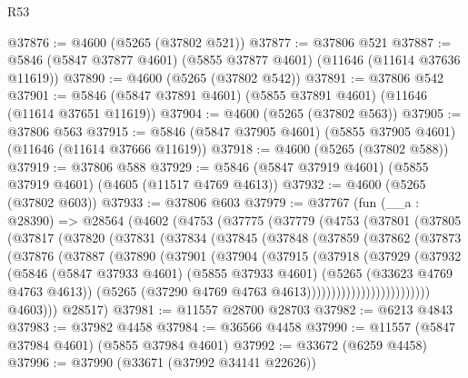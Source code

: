 \begin{lexlean}{R53}
\begin{coremodule}
@37876 := @4600 (@5265 (@37802 @521))
@37877 := @37806 @521
@37887 := @5846 (@5847 @37877 @4601) (@5855 @37877 @4601) (@11646 (@11614 @37636 @11619))
@37890 := @4600 (@5265 (@37802 @542))
@37891 := @37806 @542
@37901 := @5846 (@5847 @37891 @4601) (@5855 @37891 @4601) (@11646 (@11614 @37651 @11619))
@37904 := @4600 (@5265 (@37802 @563))
@37905 := @37806 @563
@37915 := @5846 (@5847 @37905 @4601) (@5855 @37905 @4601) (@11646 (@11614 @37666 @11619))
@37918 := @4600 (@5265 (@37802 @588))
@37919 := @37806 @588
@37929 := @5846 (@5847 @37919 @4601) (@5855 @37919 @4601) (@4605 (@11517 @4769 @4613))
@37932 := @4600 (@5265 (@37802 @603))
@37933 := @37806 @603
@37979 := @37767
    (fun (__a : @28390) =>
    @28564
      (@4602
        (@4753
          (@37775
            (@37779
              (@4753
                (@37801
                  (@37805
                    (@37817
                      (@37820
                        (@37831
                          (@37834
                            (@37845
                              (@37848
                                (@37859
                                  (@37862
                                    (@37873
                                      (@37876
                                        (@37887
                                          (@37890
                                            (@37901
                                              (@37904
                                                (@37915
                                                  (@37918
                                                    (@37929
                                                      (@37932
                                                        (@5846
                                                          (@5847 @37933 @4601)
                                                          (@5855 @37933 @4601)
                                                          (@5265 (@33623 @4769 @4763 @4613))
                                                          (@5265
                                                            (@37290
                                                              @4769
                                                              @4763
                                                              @4613)))))))))))))))))))))))))
            @4603)))
      @28517)
@37981 := @11557 @28700 @28703
@37982 := @6213 @4843
@37983 := @37982 @4458
@37984 := @36566 @4458
@37990 := @11557 (@5847 @37984 @4601) (@5855 @37984 @4601)
@37992 := @33672 (@6259 @4458)
@37996 := @37990 (@33671 (@37992 @34141 @22626))

\end{coremodule}
\end{lexlean}
